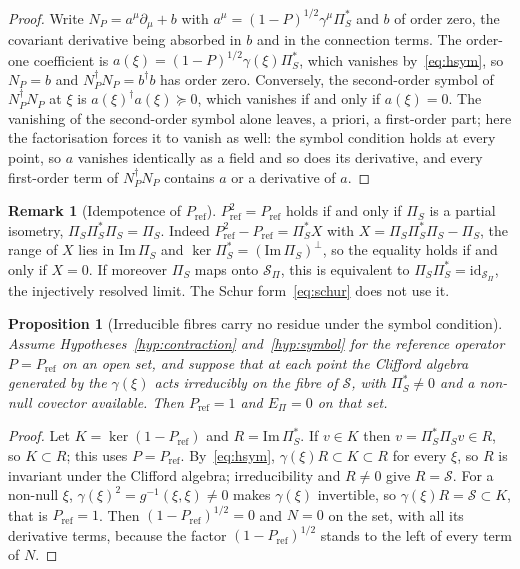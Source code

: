 \documentclass[11pt]{article}
\newtheorem{proposition}{Proposition}
\theoremstyle{definition}
\newtheorem{remark}{Remark}
\newcommand{\EPi}{E_\Pi}
\newcommand{\PiS}{\Pi_S}
\begin{document}
    \begin{proof}
      Write $N_P=a^{\mu}\partial_{\mu}+b$ with $a^{\mu}=(1-P)^{1/2}\gamma^{\mu}\PiS^{*}$ and $b$ of order zero, the
      covariant derivative being absorbed in $b$ and in the connection terms.
      The order-one coefficient is $a(\xi)=(1-P)^{1/2}\gamma(\xi)\PiS^{*}$, which vanishes by~\eqref{eq:hsym}, so
      $N_P=b$ and $N_P^{\dagger}N_P=b^{\dagger}b$ has order zero.
      Conversely, the second-order symbol of $N_P^{\dagger}N_P$ at $\xi$ is $a(\xi)^{\dagger}a(\xi)\succeq0$, which
      vanishes if and only if $a(\xi)=0$.
      The vanishing of the second-order symbol alone leaves, a priori, a first-order part; here the factorisation
      forces it to vanish as well: the symbol condition holds at every point, so $a$ vanishes identically as a field and
      so does its derivative, and every first-order term of $N_P^{\dagger}N_P$ contains $a$ or a derivative of $a$.
    \end{proof}

    \begin{remark}[Idempotence of $P_{\mathrm{ref}}$]
      \label{rem:idempotence}
      $P_{\mathrm{ref}}^2=P_{\mathrm{ref}}$ holds if and only if $\PiS$ is a partial isometry,
      $\PiS\PiS^{*}\PiS=\PiS$.
      Indeed $P_{\mathrm{ref}}^2-P_{\mathrm{ref}}=\PiS^{*}X$ with $X=\PiS\PiS^{*}\PiS-\PiS$, the range of $X$ lies in
      $\mathrm{Im}\,\PiS$ and $\ker\PiS^{*}=(\mathrm{Im}\,\PiS)^{\perp}$, so the equality holds if and only if $X=0$.
      If moreover $\PiS$ maps onto $\mathcal S_\Pi$, this is equivalent to $\PiS\PiS^{*}=\mathrm{id}_{\mathcal S_\Pi}$,
      the injectively resolved limit.
      The Schur form~\eqref{eq:schur} does not use it.
    \end{remark}

    \begin{proposition}[Irreducible fibres carry no residue under the symbol condition]
      \label{prop:irreducible}
      Assume Hypotheses~\ref{hyp:contraction} and~\ref{hyp:symbol} for the reference operator $P=P_{\mathrm{ref}}$ on an
      open set, and suppose that at each point the Clifford algebra generated by the $\gamma(\xi)$ acts irreducibly on
      the fibre of $\mathcal S$, with $\PiS^{*}\neq0$ and a non-null covector available.
      Then $P_{\mathrm{ref}}=1$ and $\EPi=0$ on that set.
    \end{proposition}

    \begin{proof}
      Let $K=\ker(1-P_{\mathrm{ref}})$ and $R=\mathrm{Im}\,\PiS^{*}$.
      If $v\in K$ then $v=\PiS^{*}\PiS v\in R$, so $K\subset R$; this uses $P=P_{\mathrm{ref}}$.
      By~\eqref{eq:hsym}, $\gamma(\xi)R\subset K\subset R$ for every $\xi$, so $R$ is invariant under the Clifford
      algebra; irreducibility and $R\neq0$ give $R=\mathcal S$.
      For a non-null $\xi$, $\gamma(\xi)^2=g^{-1}(\xi,\xi)\neq0$ makes $\gamma(\xi)$ invertible, so
      $\gamma(\xi)R=\mathcal S\subset K$, that is $P_{\mathrm{ref}}=1$.
      Then $(1-P_{\mathrm{ref}})^{1/2}=0$ and $N=0$ on the set, with all its derivative terms, because the factor
      $(1-P_{\mathrm{ref}})^{1/2}$ stands to the left of every term of $N$.
    \end{proof}
\end{document}
